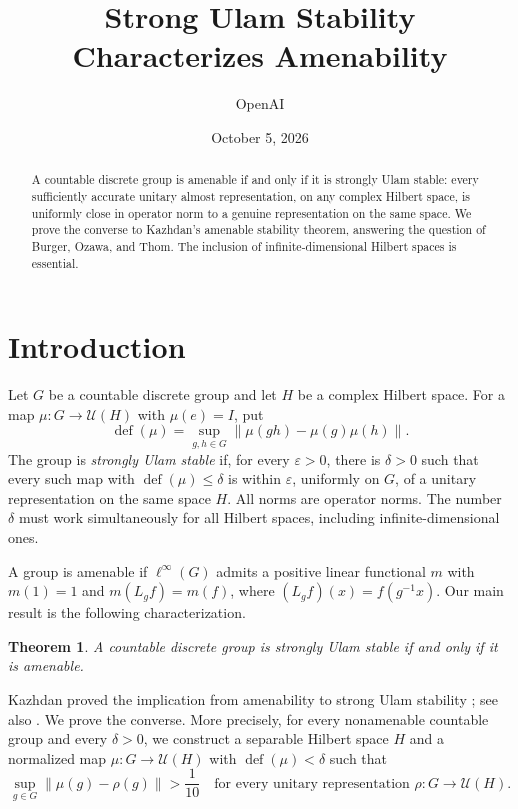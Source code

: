 \documentclass[11pt]{article}
\title{Strong Ulam Stability Characterizes Amenability}
\author{OpenAI}
\date{October 5, 2026}
\numberwithin{equation}{section}
\newtheorem{theorem}{Theorem}[section]
\theoremstyle{definition}
\theoremstyle{remark}
\newcommand{\norm}[1]{\left\lVert#1\right\rVert}
\newcommand{\defect}{\operatorname{def}}
\newcommand{\U}{\mathcal U}
\begin{document}
\maketitle
\begin{abstract}
A countable discrete group is amenable if and only if it is strongly Ulam
stable: every sufficiently accurate unitary almost representation, on any
complex Hilbert space, is uniformly close in operator norm to a genuine
representation on the same space. We prove the converse to Kazhdan's
amenable stability theorem, answering the question of Burger, Ozawa, and
Thom. The inclusion of infinite-dimensional Hilbert spaces is essential.
\end{abstract}
\section{Introduction}\label{sec:introduction}

Let $G$ be a countable discrete group and let $H$ be a complex Hilbert space.
For a map $\mu:G\to\U(H)$ with $\mu(e)=I$, put
\[
 \defect(\mu)=\sup_{g,h\in G}\norm{\mu(gh)-\mu(g)\mu(h)}.
\]
The group is \emph{strongly Ulam stable} if, for every $\varepsilon>0$, there
is $\delta>0$ such that every such map with $\defect(\mu)\le\delta$ is within
$\varepsilon$, uniformly on $G$, of a unitary representation on the same
space $H$. All norms are operator norms. The number $\delta$ must work
simultaneously for all Hilbert spaces, including infinite-dimensional ones.

A group is amenable if $\ell^\infty(G)$ admits a positive linear functional
$m$ with $m(1)=1$ and $m(L_gf)=m(f)$, where $(L_gf)(x)=f(g^{-1}x)$.
Our main result is the following characterization.

\begin{theorem}\label{thm:main}
A countable discrete group is strongly Ulam stable if and only if it is
amenable.
\end{theorem}

Kazhdan proved the implication from amenability to strong Ulam stability
\cite{Kazhdan}; see also \cite[Theorems~3.1 and~3.2]{BurgerOzawaThom}.
We prove the converse. More precisely, for every
nonamenable countable group and every $\delta>0$, we construct a separable
Hilbert space $H$ and a normalized map $\mu:G\to\U(H)$ with
$\defect(\mu)<\delta$ such that
\begin{equation}\label{eq:distance-goal}
 \sup_{g\in G}\norm{\mu(g)-\rho(g)}>\frac1{10}
 \quad\text{for every unitary representation }\rho:G\to\U(H).
\end{equation}
\end{document}
